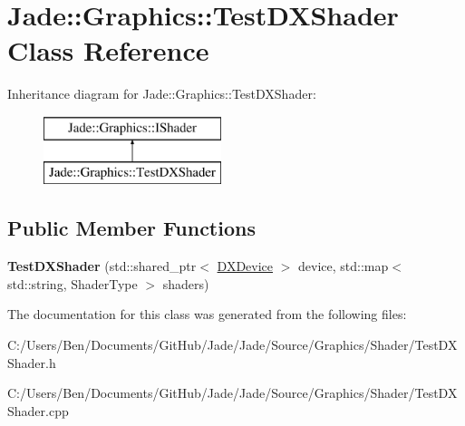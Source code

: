 \hypertarget{class_jade_1_1_graphics_1_1_test_d_x_shader}{}\section{Jade\+:\+:Graphics\+:\+:Test\+D\+X\+Shader Class Reference}
\label{class_jade_1_1_graphics_1_1_test_d_x_shader}
Inheritance diagram for Jade\+:\+:Graphics\+:\+:Test\+D\+X\+Shader\+:\begin{figure}[H]
\begin{center}
\leavevmode
\includegraphics[height=2.000000cm]{class_jade_1_1_graphics_1_1_test_d_x_shader}
\end{center}
\end{figure}
\subsection*{Public Member Functions}
\begin{DoxyCompactItemize}
\item 
\hypertarget{class_jade_1_1_graphics_1_1_test_d_x_shader_a8600fdc4c0e7316201c16673f1d9c0aa}{}{\bfseries Test\+D\+X\+Shader} (std\+::shared\+\_\+ptr$<$ \hyperlink{class_jade_1_1_graphics_1_1_d_x_device}{D\+X\+Device} $>$ device, std\+::map$<$ std\+::string, Shader\+Type $>$ shaders)\label{class_jade_1_1_graphics_1_1_test_d_x_shader_a8600fdc4c0e7316201c16673f1d9c0aa}

\end{DoxyCompactItemize}


The documentation for this class was generated from the following files\+:\begin{DoxyCompactItemize}
\item 
C\+:/\+Users/\+Ben/\+Documents/\+Git\+Hub/\+Jade/\+Jade/\+Source/\+Graphics/\+Shader/Test\+D\+X\+Shader.\+h\item 
C\+:/\+Users/\+Ben/\+Documents/\+Git\+Hub/\+Jade/\+Jade/\+Source/\+Graphics/\+Shader/Test\+D\+X\+Shader.\+cpp\end{DoxyCompactItemize}
